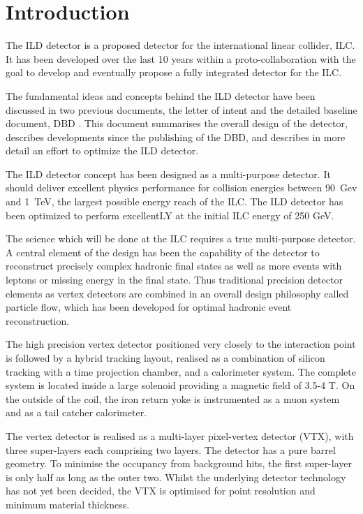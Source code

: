\chapter{Introduction}
The ILD detector is a proposed detector for the international linear collider, ILC. It has been developed over the last 10 years within a proto-collaboration with the goal to develop and eventually propose a fully integrated detector for the ILC. 

The fundamental ideas and concepts behind the ILD detector have been discussed in two previous documents, the letter of intent \cite{ild:bib:ILDloi} and the detailed baseline document, DBD \cite{ild:bib:ILDDBD}. This document summarises the overall design of the detector, describes developments since the publishing of the DBD, and describes in more detail an effort to optimize the ILD detector. 

The ILD detector concept has been designed as a multi-purpose detector. It should deliver excellent physics performance for collision energies between 90~Gev and 1~TeV, the largest possible energy reach of the ILC. The ILD detector has been optimized to perform excellentLY at the initial ILC energy of 250 GeV. 

The science which will be done at the ILC requires a true multi-purpose detector. A central element of the design has been the capability of the detector to reconstruct precisely complex hadronic final states as well as more events with leptons or missing energy in the final state. Thus traditional precision detector elements as vertex detectors are combined in an overall design philosophy called particle flow, which has been developed for optimal hadronic event reconstruction.

The high precision vertex detector positioned very closely to the interaction point is followed by a hybrid tracking layout, realised as a combination of silicon tracking with a time projection chamber, and a calorimeter system. The complete system is located inside a large solenoid providing a magnetic field of 3.5-4 T. On the outside of the coil, the iron return yoke is instrumented as a muon system and as a tail catcher calorimeter. 

The vertex detector is realised as a multi-layer pixel-vertex detector (VTX), with three super-layers each comprising two layers. The detector has a pure barrel geometry. To minimise the occupancy from background hits,
the first super-layer is only half as long as the outer two. Whilst the underlying detector technology has not yet been decided, 
the VTX is optimised for point resolution and minimum material thickness. 
	
